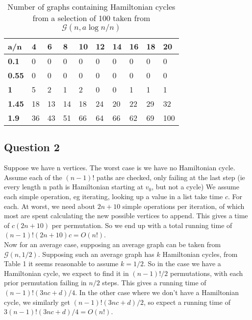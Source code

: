\documentclass[10pt,a4paper]{report}
\begin{document}
\begin{table}[h]
\centering
\begin{tabular}{|l|l|l|l|l|l|l|l|l|l|}
\hline
\textbf{a/n}  & \textbf{4} & \textbf{6} & \textbf{8} & \textbf{10} & \textbf{12} & \textbf{14} & \textbf{16} & \textbf{18} & \textbf{20} \\ \hline
\textbf{0.1}  & 0          & 0          & 0          & 0           & 0           & 0           & 0           & 0           & 0           \\ \hline
\textbf{0.55} & 0          & 0          & 0          & 0           & 0           & 0           & 0           & 0           & 0           \\ \hline
\textbf{1}    & 5          & 2          & 1          & 2           & 0           & 0           & 1           & 1           & 1           \\ \hline
\textbf{1.45} & 18         & 13         & 14         & 18          & 24          & 20          & 22          & 29          & 32          \\ \hline
\textbf{1.9}  & 36         & 43         & 51         & 66          & 64          & 66          & 62          & 69          & 100         \\ \hline
\end{tabular}
\caption{Number of graphs containing Hamiltonian cycles from a selection of 100 taken from $
\mathcal{G}(n,a\log{n}/n)$}
\label{tab:my-table}
\end{table}

\subsection*{Question 2}
Suppose we have n vertices. The worst case is we have no Hamiltonian cycle. Assume each of the $(n-1)!$ paths are checked, only failing at the last step (ie every length n path is Hamiltonian starting at $v_0$, but not a cycle) We assume each simple operation, eg iterating, looking up a value in a list take time $c$. For each. At worst, we need about $2n+10$ simple operations per iteration, of which most are spent calculating the new possible vertices to append. This gives a time of $c(2n+10)$ per permutation. So we end up with a total running time of $(n-1)!(2n+10)c = O(n!)$.\\

Now for an average case, supposing an average graph can be taken from $\mathcal{G}(n,1/2)$. Supposing such an average graph has $k$ Hamiltonian cycles, from Table 1 it seems reasonable to assume $k=1/2$. So in the case we have a Hamiltonian cycle, we expect to find it in $(n-1)!/2$ permutations, with each prior permutation failing in $n/2$ steps. This gives a running time of $(n-1)!(3nc+d)/4$. In the other case where we don't have a Hamiltonian cycle, we similarly get $(n-1)!(3nc+d)/2$, so expect a running time of $3(n-1)!(3nc+d)/4 = O(n!)$. \\
\end{document}
